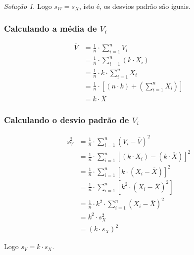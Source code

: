 \documentclass[
]{latex/krantz}
\theoremstyle{definition}
\theoremstyle{definition}
\theoremstyle{definition}
\theoremstyle{definition}
\theoremstyle{remark}
\newtheorem*{solution}{Solução}
\begin{document}
\begin{solution}
Logo \(s_W = s_X\), isto é, os desvios padrão são iguais.

\hypertarget{calculando-a-muxe9dia-de-v_i}{%
\subsubsection*{\texorpdfstring{Calculando a média de \(V_i\)}{Calculando a média de V\_i}}\label{calculando-a-muxe9dia-de-v_i}}

\[
\begin{split}
\overline{V} & = \frac{1}{n} \cdot \sum _{i = 1}^{n} V_i \\
             & = \frac{1}{n} \cdot \sum _{i = 1}^{n} \left( k \cdot X_i \right) \\
             & = \frac{1}{n} \cdot k \cdot \sum _{i = 1}^{n} X_i \\
             & = \frac{1}{n} \cdot \left[ \left( n \cdot k \right) + \left( \sum _{i = 1}^{n} X_i \right) \right]\\
             & = k \cdot \overline{X}
\end{split}
\]

\hypertarget{calculando-o-desvio-padruxe3o-de-v_i}{%
\subsubsection*{\texorpdfstring{Calculando o desvio padrão de \(V_i\)}{Calculando o desvio padrão de V\_i}}\label{calculando-o-desvio-padruxe3o-de-v_i}}

\[
\begin{split}
s_V^2 & = \frac{1}{n} \cdot \sum_{i = 1}^{n}(V_i - \overline{V})^2 \\
      & = \frac{1}{n} \cdot \sum_{i = 1}^{n}\left[ \left( k \cdot X_i \right) - \left(k \cdot \overline{X} \right) \right]^2 \\
      & = \frac{1}{n} \cdot \sum_{i = 1}^{n}\left[ k \cdot \left( X_i - \overline{X} \right) \right]^2 \\
      & = \frac{1}{n} \cdot \sum_{i = 1}^{n}\left[ k^2 \cdot \left( X_i - \overline{X} \right)^2 \right] \\
      & = \frac{1}{n} \cdot  k^2 \cdot \sum_{i = 1}^{n} \left( X_i - \overline{X} \right)^2 \\
      & =  k^2 \cdot s_X^2 \\
      & = (k \cdot s_X)^2
\end{split}
\]

Logo \(s_V = k \cdot s_X\).

\end{solution}
\end{document}
